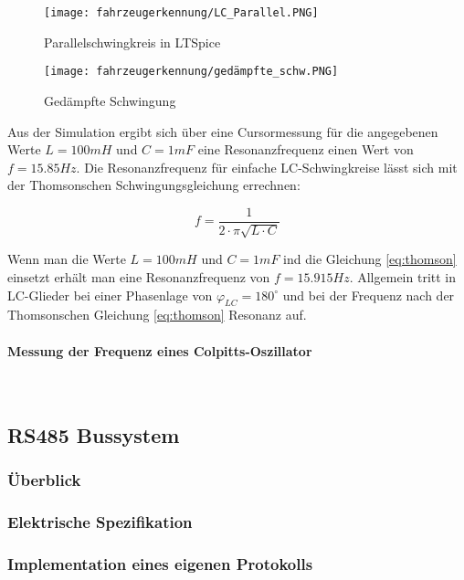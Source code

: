 \begin{figure}[H]
    \centering
    \texttt{[image: fahrzeugerkennung/LC\_Parallel.PNG]}
    \caption{Parallelschwingkreis in LTSpice}
\end{figure}

\begin{figure}[H]
    \centering
    \texttt{[image: fahrzeugerkennung/gedämpfte\_schw.PNG]}
    \caption{Gedämpfte Schwingung}
\end{figure}

Aus der Simulation ergibt sich über eine Cursormessung für die angegebenen Werte $L = 100mH$ und $C = 1mF$ eine Resonanzfrequenz einen Wert von $f = 15.85Hz$. Die Resonanzfrequenz für einfache LC-Schwingkreise lässt sich mit der
Thomsonschen Schwingungsgleichung errechnen:

\begin{equation} \label{eq:thomson}
    f = \frac{1}{2 \cdot \pi \sqrt{L \cdot C}}
\end{equation}

Wenn man die Werte $L = 100mH$ und $C = 1mF$ ind die Gleichung \ref{eq:thomson} einsetzt erhält man eine Resonanzfrequenz von $f = 15.915Hz$.
Allgemein tritt in LC-Glieder bei einer Phasenlage von $\varphi_{LC} = 180^{\circ}$ und bei der Frequenz nach der Thomsonschen Gleichung \ref{eq:thomson}  Resonanz auf. 

\paragraph{Messung der Frequenz eines Colpitts-Oszillator}\mbox{}\\



\subsection{RS485 Bussystem}
\subsubsection{Überblick}
\subsubsection{Elektrische Spezifikation}
\subsubsection{Implementation eines eigenen Protokolls}

